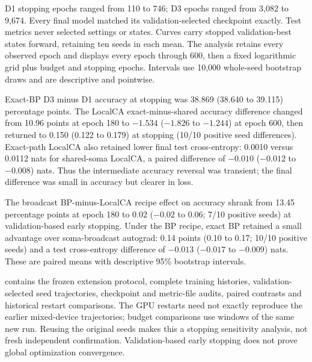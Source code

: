 D1 stopping epochs ranged from 110 to 746; D3 epochs ranged from 3,082 to 9,674. Every final model matched its validation-selected checkpoint exactly. Test metrics never selected settings or states. Curves carry stopped validation-best states forward, retaining ten seeds in each mean. The analysis retains every observed epoch and displays every epoch through 600, then a fixed logarithmic grid plus budget and stopping epochs. Intervals use 10,000 whole-seed bootstrap draws and are descriptive and pointwise.

Exact-BP D3 minus D1 accuracy at stopping was 38.869 (38.640 to 39.115) percentage points. The LocalCA exact-minus-shared accuracy difference changed from 10.96 points at epoch 180 to $-1.534$ ($-1.826$ to $-1.244$) at epoch 600, then returned to 0.150 (0.122 to 0.179) at stopping (10/10 positive seed differences). Exact-path LocalCA also retained lower final test cross-entropy: 0.0010 versus 0.0112 nats for shared-soma LocalCA, a paired difference of $-0.010$ ($-0.012$ to $-0.008$) nats. Thus the intermediate accuracy reversal was transient; the final difference was small in accuracy but clearer in loss.

The broadcast BP-minus-LocalCA recipe effect on accuracy shrank from 13.45 percentage points at epoch 180 to 0.02 ($-0.02$ to 0.06; 7/10 positive seeds) at validation-based early stopping. Under the BP recipe, exact BP retained a small advantage over soma-broadcast autograd: 0.14 points (0.10 to 0.17; 10/10 positive seeds) and a test cross-entropy difference of $-0.013$ ($-0.017$ to $-0.009$) nats. These are paired means with descriptive 95\% bootstrap intervals.

 contains the frozen extension protocol, complete training histories, validation-selected seed trajectories, checkpoint and metric-file audits, paired contrasts and historical restart comparisons. The GPU restarts need not exactly reproduce the earlier mixed-device trajectories; budget comparisons use windows of the same new run. Reusing the original seeds makes this a stopping sensitivity analysis, not fresh independent confirmation. Validation-based early stopping does not prove global optimization convergence.

